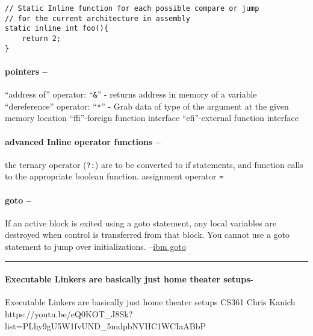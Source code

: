 \begin{verbatim}
// Static Inline function for each possible compare or jump
// for the current architecture in assembly
static inline int foo(){
    return 2;
}
\end{verbatim}

\hypertarget{pointers}{%
\paragraph{pointers --}\label{pointers}}

``address of'' operator: ``\texttt{\&}'' - returns address in memory of
a variable ``dereference'' operator: ``\texttt{*}'' - Grab data of type
of the argument at the given memory location ``ffi''-foreign function
interface ``efi''-external function interface

\hypertarget{advanced-inline-operator-functions}{%
\paragraph{advanced Inline operator functions
--}\label{advanced-inline-operator-functions}}

the ternary operator (\texttt{?:}) are to be converted to if statements,
and function calls to the appropriate boolean function. assignment
operator \texttt{=}

\hypertarget{goto}{%
\paragraph{goto --}\label{goto}}

If an active block is exited using a goto statement, any local variables
are destroyed when control is transferred from that block. You cannot
use a goto statement to jump over initializations.
--\href{https://www.ibm.com/docs/en/zos/2.1.0?topic=statements-goto-\%20statement}{ibm
goto}

\begin{center}\rule{0.5\linewidth}{0.5pt}\end{center}

\hypertarget{executable-linkers-are-basically-just-home-theater-setups-}{%
\paragraph{Executable Linkers are basically just home theater
setups-}\label{executable-linkers-are-basically-just-home-theater-setups-}}

Executable Linkers are basically just home theater setups CS361 Chris
Kanich
https://youtu.be/eQ0KOT\_J8Sk?list=PLhy9gU5W1fvUND\_5mdpbNVHC1WCIaABbP

